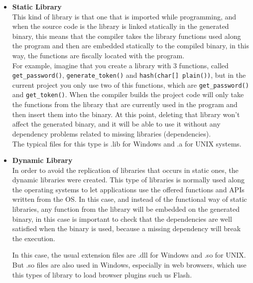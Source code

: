 \begin{itemize}
  \item 
  \textbf{Static Library}
  \\
  This kind of library is that one that is imported while programming, and when the source code is the library is linked statically in the generated binary, this means that the compiler takes the library functions used along the program and then are embedded statically to the compiled binary, in this way, the functions are fiscally located with the program. 
\\
For example, imagine that you create a library with 3 functions, called \verb!get_password()!, \verb!generate_token()! and \verb!hash(char[] plain())!,  but in the current project you only use two of this functions, which are \verb!get_password()! and \verb!get_token()!. When the compiler builds the project code will only take the functions from the library that are currently used in the program and then insert them into the binary. At this point, deleting that library won't affect the generated binary, and it will be able to use it without any dependency problems related to missing libraries (dependencies).
\\
The typical files for this type is .lib for Windows and .a for UNIX systems.
  
  \item
  \textbf{Dynamic Library}
  \\
  In order to avoid the replication of libraries that occurs in static ones, the dynamic libraries were created. This type of libraries is normally used along the operating systems to let applications use the offered functions and APIs written from the OS. In this case, and instead of the functional way of static libraries, any function from the library will be embedded on the generated binary, in this case is important to check that the dependencies are well satisfied when the binary is used, because a missing dependency will break the execution.

In this case, the usual extension files are .dll for Windows and .so for UNIX. But .so files are also used in Windows, especially in web browsers, which use this types of library to load browser plugins such us Flash.


\end{itemize}
